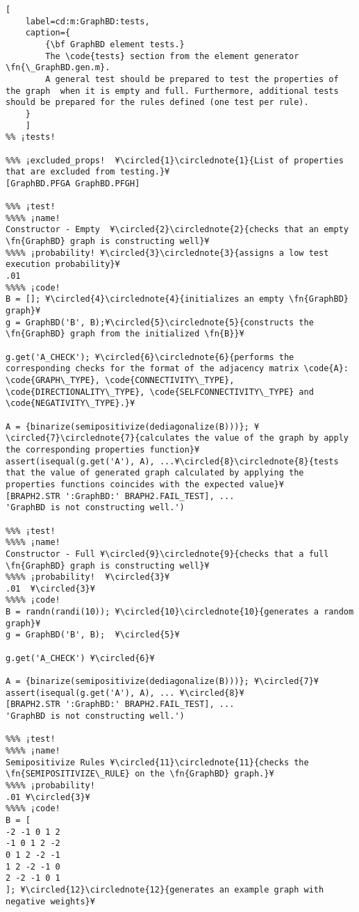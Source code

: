 \documentclass{tufte-handout}
\begin{document}
\begin{lstlisting}[
	label=cd:m:GraphBD:tests,
	caption={
		{\bf GraphBD element tests.}
		The \code{tests} section from the element generator \fn{\_GraphBD.gen.m}.
		A general test should be prepared to test the properties of the graph  when it is empty and full. Furthermore, additional tests should be prepared for the rules defined (one test per rule).
	}
	]			
%% ¡tests!

%%% ¡excluded_props!  ¥\circled{1}\circlednote{1}{List of properties that are excluded from testing.}¥
[GraphBD.PFGA GraphBD.PFGH]

%%% ¡test!
%%%% ¡name!
Constructor - Empty  ¥\circled{2}\circlednote{2}{checks that an empty \fn{GraphBD} graph is constructing well}¥
%%%% ¡probability! ¥\circled{3}\circlednote{3}{assigns a low test execution probability}¥
.01
%%%% ¡code!
B = []; ¥\circled{4}\circlednote{4}{initializes an empty \fn{GraphBD} graph}¥
g = GraphBD('B', B);¥\circled{5}\circlednote{5}{constructs the \fn{GraphBD} graph from the initialized \fn{B}}¥

g.get('A_CHECK'); ¥\circled{6}\circlednote{6}{performs the corresponding checks for the format of the adjacency matrix \code{A}: \code{GRAPH\_TYPE}, \code{CONNECTIVITY\_TYPE}, \code{DIRECTIONALITY\_TYPE}, \code{SELFCONNECTIVITY\_TYPE} and \code{NEGATIVITY\_TYPE}.}¥

A = {binarize(semipositivize(dediagonalize(B)))}; ¥\circled{7}\circlednote{7}{calculates the value of the graph by apply the corresponding properties function}¥
assert(isequal(g.get('A'), A), ...¥\circled{8}\circlednote{8}{tests that the value of generated graph calculated by applying the properties functions coincides with the expected value}¥
[BRAPH2.STR ':GraphBD:' BRAPH2.FAIL_TEST], ...
'GraphBD is not constructing well.')

%%% ¡test!
%%%% ¡name!
Constructor - Full ¥\circled{9}\circlednote{9}{checks that a full \fn{GraphBD} graph is constructing well}¥
%%%% ¡probability!  ¥\circled{3}¥
.01  ¥\circled{3}¥
%%%% ¡code!
B = randn(randi(10)); ¥\circled{10}\circlednote{10}{generates a random graph}¥
g = GraphBD('B', B);  ¥\circled{5}¥

g.get('A_CHECK') ¥\circled{6}¥

A = {binarize(semipositivize(dediagonalize(B)))}; ¥\circled{7}¥
assert(isequal(g.get('A'), A), ... ¥\circled{8}¥
[BRAPH2.STR ':GraphBD:' BRAPH2.FAIL_TEST], ...
'GraphBD is not constructing well.')

%%% ¡test!
%%%% ¡name!
Semipositivize Rules ¥\circled{11}\circlednote{11}{checks the \fn{SEMIPOSITIVIZE\_RULE} on the \fn{GraphBD} graph.}¥
%%%% ¡probability!
.01 ¥\circled{3}¥
%%%% ¡code!
B = [
-2 -1 0 1 2
-1 0 1 2 -2
0 1 2 -2 -1
1 2 -2 -1 0
2 -2 -1 0 1
]; ¥\circled{12}\circlednote{12}{generates an example graph with negative weights}¥


\end{lstlisting}
\end{document}
